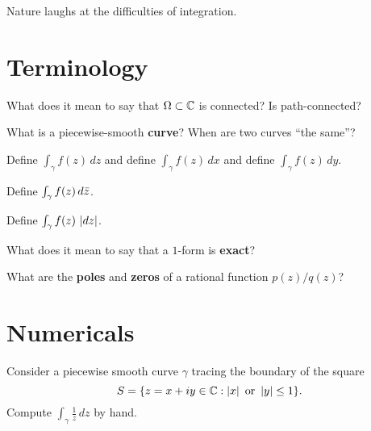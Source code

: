 \documentclass{homework}
\author{Jim Fowler}
\begin{document}
\maketitle

\begin{inspiration}
Nature laughs at the difficulties of integration.
\end{inspiration}

\section{Terminology}

\begin{problem}
  What does it mean to say that $\Omega \subset \mathbb{C}$ is connected?  Is path-connected?  
\end{problem}

\begin{problem}
  What is a piecewise-smooth \textbf{curve}?  When are two curves ``the same''?  
\end{problem}

\begin{problem}
    Define $\int_\gamma f(z) \, dz$ and define $\int_\gamma f(z) \, dx$ and define $\int_\gamma f(z) \, dy$.
\end{problem}

\begin{problem}
  Define $\int_\gamma f(z) \, d\bar{z}$.
\end{problem}

\begin{problem}
  Define $\int_\gamma f(z) \, \left|dz\right|$.
\end{problem}

\begin{problem}
  What does it mean to say that a $1$-form is \textbf{exact}?
\end{problem}

\begin{problem}
  What are the \textbf{poles} and \textbf{zeros} of a rational
  function $p(z)/q(z)$?
\end{problem}

\section{Numericals}

\begin{problem}Consider a piecewise smooth curve $\gamma$ tracing the boundary of the square
  $$S = \{ z = x+iy\in \mathbb{C} : \left|x\right| \mbox{ or } \left|y\right| \leq 1 \}.$$
  Compute $\displaystyle\int_\gamma \frac{1}{z} \, dz$ by hand.
\end{problem}
\end{document}
